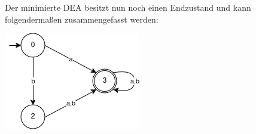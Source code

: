 	Der minimierte DEA besitzt nun noch einen Endzustand und kann folgendermaßen zusammengefasst werden:
	
	\includegraphics[scale=0.75]{MiniDEA3} 

